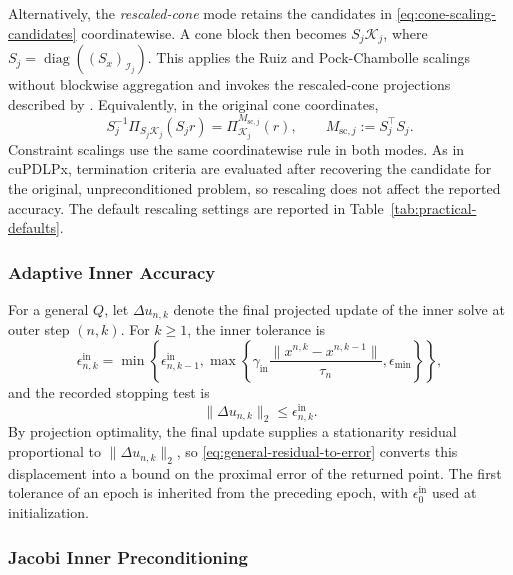 \documentclass[letterpaper]{article} %
\theoremstyle{definition}
\theoremstyle{remark}
\begin{document}
Alternatively, the \emph{rescaled-cone} mode retains the candidates in
\eqref{eq:cone-scaling-candidates} coordinatewise. A cone block then becomes
$S_j\mathcal K_j$, where
$S_j=\operatorname{diag}((S_x)_{\mathcal I_j})$. This applies the Ruiz and
Pock-Chambolle scalings without blockwise aggregation and invokes the
rescaled-cone projections described by \cite{lin2025pdcs}. Equivalently, in
the original cone coordinates,
\begin{equation}
\label{eq:scaling-induced-metric}
    S_j^{-1}\Pi_{S_j\mathcal K_j}(S_jr)
    =\Pi_{\mathcal K_j}^{M_{\mathrm{sc},j}}(r),
    \qquad
    M_{\mathrm{sc},j}:=S_j^\top S_j.
\end{equation}
Constraint
scalings use the same coordinatewise rule in both modes. As in cuPDLPx,
termination criteria are evaluated after recovering the candidate for the
original, unpreconditioned problem, so rescaling does not affect the reported
accuracy.
The default rescaling settings are reported in
Table~\ref{tab:practical-defaults}.

\subsubsection{Adaptive Inner Accuracy}
\label{sec:adaptive-inner-accuracy}

For a general $Q$, let $\Delta u_{n,k}$ denote the final projected update of
the inner solve at outer step $(n,k)$. For $k\ge1$, the inner tolerance is
\begin{equation}
\label{eq:monotone-primal-inner-tol}
    \epsilon_{n,k}^{\mathrm{in}}
    =
    \min\left\{
        \epsilon_{n,k-1}^{\mathrm{in}},
        \max\left\{
            \gamma_{\mathrm{in}}
            \frac{\|x^{n,k}-x^{n,k-1}\|}{\tau_n},
            \epsilon_{\min}
        \right\}
    \right\},
\end{equation}
and the recorded stopping test is
\begin{equation}
\label{eq:current-inner-step-stop}
    \|\Delta u_{n,k}\|_2
    \le \epsilon_{n,k}^{\mathrm{in}}.
\end{equation}
By projection optimality, the final update supplies a stationarity residual
proportional to $\|\Delta u_{n,k}\|_2$, so
\eqref{eq:general-residual-to-error} converts this displacement into a bound
on the proximal error of the returned point.
The first tolerance of an epoch is inherited from the preceding epoch, with
$\epsilon_{0}^{\mathrm{in}}$ used at initialization.

\subsubsection{Jacobi Inner Preconditioning}
\label{sec:jacobi-inner-preconditioning}
\end{document}
